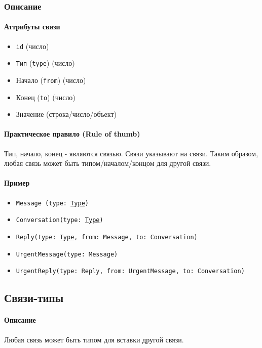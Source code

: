\documentclass{article}
\begin{document}
\subsubsection{Описание}

\paragraph{Аттрибуты связи}

\begin{itemize}
  \item \texttt{id} (число)
  \item \texttt{Тип} (\texttt{type}) (число)
  \item Начало (\texttt{from}) (число)
  \item Конец (\texttt{to}) (число)
  \item Значение (строка/число/объект)
\end{itemize}

\paragraph{Практическое правило (Rule of thumb)}
Тип, начало, конец - являются связью. Связи указывают на связи. Таким образом,
любая связь может быть типом/началом/концом для другой связи.

\paragraph{Пример}

\begin{itemize}
  \item \texttt{Message (type: \hyperlink{type.Def}{Type})}
  \item \texttt{Conversation(type: \hyperlink{type.Def}{Type})}
  \item \texttt{Reply(type: \hyperlink{type.Def}{Type}, from: Message, to:
          Conversation)}
  \item \texttt{UrgentMessage(type: Message)}
  \item \texttt{UrgentReply(type: Reply, from: UrgentMessage, to:
          Conversation)}
\end{itemize}

\subsection{Связи-типы}
\paragraph{Описание}
Любая связь может быть типом для вставки другой связи.
\end{document}
